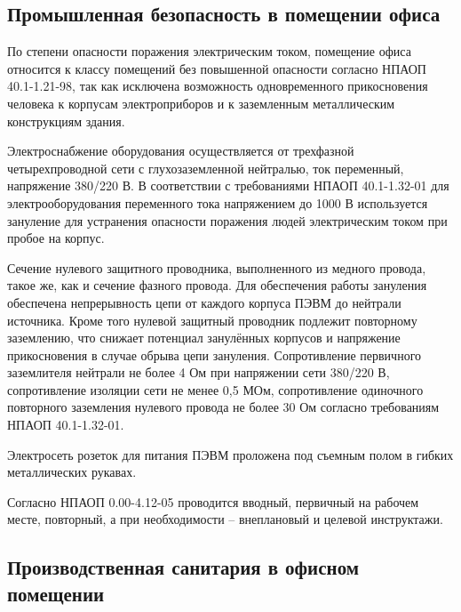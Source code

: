 \subsection{Промышленная безопасность в помещении офиса}

По степени опасности поражения электрическим током, помещение офиса относится к классу помещений без повышенной
опасности согласно НПАОП 40.1-1.21-98, так как исключена возможность одновременного прикосновения человека к корпусам
электроприборов и к заземленным металлическим конструкциям здания.

Электроснабжение оборудования осуществляется от трехфазной четырехпроводной сети с глухозаземленной нейтралью,
ток переменный, напряжение 380/220 В. В соответствии с требованиями НПАОП 40.1-1.32-01 для электрооборудования
переменного тока напряжением до 1000 В используется зануление для устранения опасности поражения людей электрическим
током при пробое на корпус. 

Сечение нулевого защитного проводника, выполненного из медного провода, такое же, как и сечение фазного провода.
Для обеспечения работы зануления обеспечена непрерывность цепи от каждого корпуса ПЭВМ до нейтрали источника.
Кроме того нулевой защитный проводник подлежит повторному заземлению, что снижает потенциал занулённых корпусов
и напряжение прикосновения в случае обрыва цепи зануления. Сопротивление первичного заземлителя нейтрали не более
4 Ом при напряжении сети 380\slash220 В, сопротивление изоляции сети не менее 0,5 МОм, сопротивление одиночного повторного
заземления нулевого провода не более 30 Ом согласно требованиям НПАОП 40.1-1.32-01. 

Электросеть розеток для питания ПЭВМ проложена под съемным полом в гибких металлических рукавах.

Согласно НПАОП 0.00-4.12-05 проводится вводный, первичный на рабочем месте, повторный, а при необходимости -- 
внеплановый и целевой инструктажи.

\subsection{Производственная санитария в офисном помещении}

